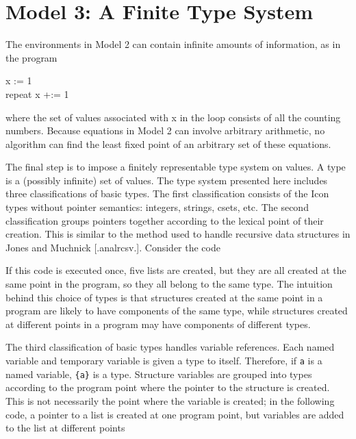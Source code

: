 \section{Model 3: A Finite Type System}

The environments in Model 2 can contain infinite amounts of
information, as in the program

\goodbreak
\begin{iconcode}
\>x := 1\\
\>repeat x +:= 1\\
\end{iconcode}

\noindent where the set of values associated with x in the loop
consists of all the counting numbers. Because equations in Model 2 can
involve arbitrary arithmetic, no algorithm can find the least fixed
point of an arbitrary set of these equations.

The final step is to impose a finitely representable type system on
values. A type is a (possibly infinite) set of values. The type system
presented here includes three classifications of basic types. The
first classification consists of the Icon types without pointer
semantics: integers, strings, csets, etc. The second classification
groups pointers together according to the lexical point of their
creation. This is similar to the method used to handle recursive data
structures in Jones and Muchnick [.analrcsv.]. Consider the code



If this code is executed once, five lists are created, but they are
all created at the same point in the program, so they all belong to
the same type. The intuition behind this choice of types is that
structures created at the same point in a program are likely to have
components of the same type, while structures created at different
points in a program may have components of different types.

The third classification of basic types handles variable
references. Each named variable and temporary variable is given a type
to itself. Therefore, if \texttt{a} is a named variable,
\texttt{\{a\}} is a type. Structure variables are grouped into types
according to the program point where the pointer to the structure is
created. This is not necessarily the point where the variable is
created; in the following code, a pointer to a list is created at one
program point, but variables are added to the list at different points

